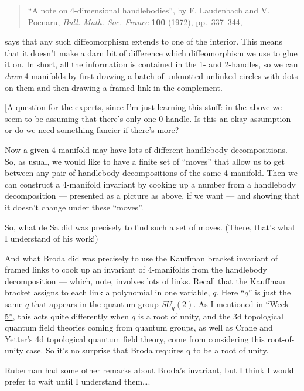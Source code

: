 \documentclass{article}
\renewcommand{\texttt}[1]{%
  \begingroup
  \ttfamily
  \begingroup\lccode`~=`/\lowercase{\endgroup\def~}{/\discretionary{}{}{}}%
  \begingroup\lccode`~=`[\lowercase{\endgroup\def~}{[\discretionary{}{}{}}%
  \begingroup\lccode`~=`.\lowercase{\endgroup\def~}{.\discretionary{}{}{}}%
  \catcode`/=\active\catcode`[=\active\catcode`.=\active
  \scantokens{#1\noexpand}%
  \endgroup
}
\begin{document}
\begin{quote}
``A note on 4-dimensional handlebodies'', by F. Laudenbach and V.
Poenaru, \emph{Bull. Math. Soc. France} \textbf{100} (1972),
pp.~337--344,
\end{quote}

says that any such diffeomorphism extends to one of the interior. This
means that it doesn't make a darn bit of difference which diffeomorphism
we use to glue it on. In short, all the information is contained in the
1- and 2-handles, so we can \emph{draw} 4-manifolds by first drawing a
batch of unknotted unlinked circles with dots on them and then drawing a
framed link in the complement.

{[}A question for the experts, since I'm just learning this stuff: in
the above we seem to be assuming that there's only one 0-handle. Is this
an okay assumption or do we need something fancier if there's more?{]}

Now a given 4-manifold may have lots of different handlebody
decompositions. So, as usual, we would like to have a finite set of
``moves'' that allow us to get between any pair of handlebody
decompositions of the same 4-manifold. Then we can construct a
4-manifold invariant by cooking up a number from a handlebody
decomposition --- presented as a picture as above, if we want --- and
showing that it doesn't change under these ``moves''.

So, what de Sa did was precisely to find such a set of moves. (There,
that's what I understand of his work!)

And what Broda did was precisely to use the Kauffman bracket invariant
of framed links to cook up an invariant of 4-manifolds from the
handlebody decomposition --- which, note, involves lots of links. Recall
that the Kauffman bracket assigns to each link a polynomial in one
variable, \(q\). Here ``\(q\)'' is just the same \(q\) that appears in
the quantum group \(SU_q(2)\). As I mentioned in
\protect\hyperlink{week5}{``Week 5''}, this acts quite differently when
\(q\) is a root of unity, and the 3d topological quantum field theories
coming from quantum groups, as well as Crane and Yetter's 4d topological
quantum field theory, come from considering this root-of-unity case. So
it's no surprise that Broda requires q to be a root of unity.

Ruberman had some other remarks about Broda's invariant, but I think I
would prefer to wait until I understand them\ldots.

\end{document}
